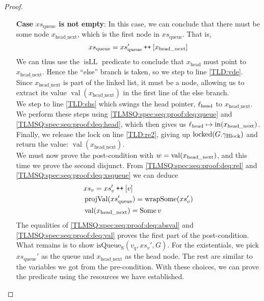 \documentclass[a4paper, 10pt]{report}
\theoremstyle{definition}
\newcommand{\locked}{\operatorname{locked}}
\newcommand{\isqueueseq}{\operatorname{isQueue_{S}}}
\newcommand{\vq}{v_q}
\newcommand{\xsqueue}{xs_{\mathrm{queue}}}
\newcommand{\isLL}{\operatorname{isLL}}
\newcommand{\projval}{\operatorname{projVal}}
\newcommand{\wrapsome}{\operatorname{wrapSome}}
\newcommand{\locN}[1]{\loc_{\mathrm{#1}}}
\newcommand{\lochead}{\locN{head}}
\newcommand{\nodeval}{\valB}
\newcommand{\nIn}[1]{\operatorname{in}(#1)}
\newcommand{\nVal}[1]{\operatorname{val}(#1)}
\newcommand{\node}{x}
\newcommand{\nodeN}[1]{\node_{\mathrm{#1}}}
\newcommand{\nodehead}{\nodeN{head}}
\newcommand{\nodeheadnext}{\nodeN{head\_next}}
\newcommand{\absvalue}{\val}
\newcommand{\absvalueList}{xs_v}
\newcommand{\Qg}{G}
\newcommand{\ghlock}{\gname_{\mathrm{Hlock}}}
\newcommand\catenate{\mathbin{\text{\ttfamily\upshape ++}}}
\begin{document}
\begin{proof}
\begin{itemize}
  In this case, \ref{TLMSQ:spec:seq:proof:deq:isLL} simply asserts $\isLL [\nodehead]$, which by definition tells us that $\nodehead \mapsto \None$. Hence, the ``if'' on line \ref{TLD:ifn} takes the ``then'' branch, so we step to line \ref{TLD:re1}. Here we release the lock, giving up $\locked(\Qg.\ghlock)$, and return $\None$ on the next line. What remains is to prove the post-condition with $\nodeval = \None$. We can easily do this by proving the first disjunction. From \ref{TLMSQ:spec:seq:proof:deq:rel} with the fact that $\xsqueue = []$ we can conclude that $\absvalueList$ is empty, and since we have not modified the queue, we can prove $\isqueueseq(\vq, \absvalueList, \Qg)$ using the same resources we got from the pre-condition.

  \item[\textbf{Case}] \textbf{$\xsqueue$ is not empty}:
  In this case, we can conclude that there must be some node $\nodeheadnext$, which is the first node in $\xsqueue$. That is,
  \begin{equation}
    \xsqueue = \xsqueue' \catenate [\nodeheadnext]\label{TLMSQ:spec:seq:proof:deq:xsqueue}
  \end{equation}
  We can thus use the $\isLL$ predicate to conclude that $\nodehead$ must point to $\nodeheadnext$. Hence the ``else'' branch is taken, so we step to line \ref{TLD:vde}. Since $\nodeheadnext$ is part of the linked list, it must be a node, allowing us to extract its value $\nVal{\nodeheadnext}$ in the first line of the else branch.\\
  We step to line \ref{TLD:shs} which swings the head pointer, $\lochead$ to $\nodeheadnext$. We perform these steps using \ref{TLMSQ:spec:seq:proof:deq:queue} and \ref{TLMSQ:spec:seq:proof:deq:head}, which then gives us $\lochead \mapsto \nIn{\nodeheadnext}$.\\
  Finally, we release the lock on line \ref{TLD:re2}, giving up $\locked(\Qg.\ghlock)$ and return the value: $\nVal{\nodeheadnext}$.\\
  We must now prove the post-condition with $\nodeval = \nVal{\nodeheadnext}$, and this time we prove the second disjunct. From \ref{TLMSQ:spec:seq:proof:deq:rel} and \ref{TLMSQ:spec:seq:proof:deq:xsqueue} we can deduce
  \begin{align}
    &\absvalueList = \absvalueList' \catenate [\absvalue]\label{TLMSQ:spec:seq:proof:deq:absval}\\
    &\projval(\xsqueue') = \wrapsome(\absvalueList')\label{TLMSQ:spec:seq:proof:deq:rel'}\\
    &\nVal{\nodeheadnext} = \Some{\absvalue}\label{TLMSQ:spec:seq:proof:deq:val}
  \end{align}
  The equalities of \ref{TLMSQ:spec:seq:proof:deq:absval} and \ref{TLMSQ:spec:seq:proof:deq:val} proves the first part of the post-condition. What remains is to show $\isqueueseq(\vq, \absvalueList', \Qg)$. For the existentials, we pick $\xsqueue'$ as the queue and $\nodeheadnext$ as the head node. The rest are similar to the variables we got from the pre-condition. With these choices, we can prove the predicate using the resources we have established.
\end{itemize}
\end{proof}
\end{document}
